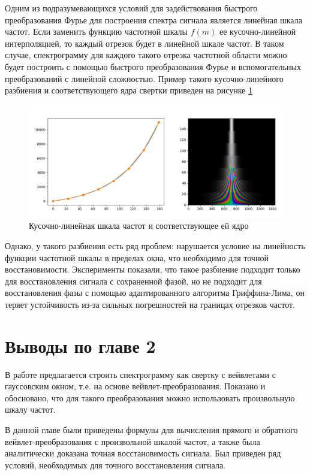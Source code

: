 Одним из подразумевающихся условий для задействования быстрого преобразования Фурье 
для построения спектра сигнала является линейная шкала частот. Если заменить функцию частотной шкалы $f(m)$ ее кусочно-линейной интерполяцией,
то каждый отрезок будет в линейной шкале частот. В таком случае, спектрограмму для каждого такого отрезка частотной области 
можно будет построить с помощью быстрого преобразования Фурье и вспомогательных преобразований с линейной сложностью. 
Пример такого кусочно-линейного разбиения и соответствующего ядра свертки приведен на рисунке \ref{fig:part_linear_kernel}

\begin{figure}
  \centering
  \includegraphics[width=0.9\linewidth]{figures/part_linear_kernel}
  \caption{Кусочно-линейная шкала частот и соответствующее ей ядро}
  \label{fig:part_linear_kernel}
\end{figure}

Однако, у такого разбиения есть ряд проблем: нарушается условие на линейность функции частотной шкалы в пределах окна, 
что необходимо для точной восстановимости.
Эксперименты показали, что такое разбиение подходит только для восстановления сигнала с сохраненной фазой, 
но не подходит для восстановления фазы с помощью адаптированного алгоритма Гриффина-Лима, 
он теряет устойчивость из-за сильных погрешностей на границах отрезков частот.


\section{Выводы по главе 2}

В работе предлагается строить спектрограмму как свертку с вейвлетами с гауссовским окном, т.е. на основе вейвлет-преобразования. 
Показано и обосновано, что для такого преобразования можно использовать произвольную шкалу частот.

В данной главе были приведены формулы для вычисления прямого и обратного вейвлет-преобразования с произвольной шкалой частот,
а также была аналитически доказана точная восстановимость сигнала. Был приведен ряд условий, необходимых для точного восстановления сигнала.

